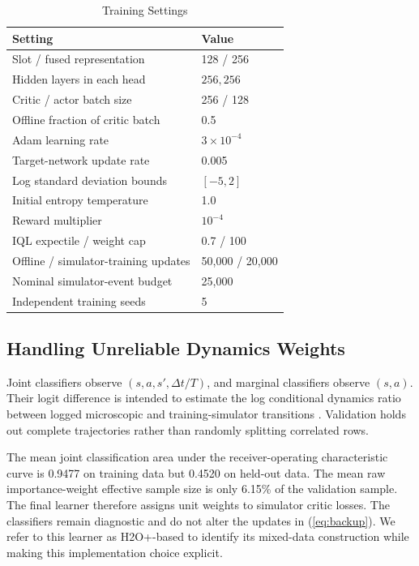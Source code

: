 \documentclass[letterpaper,journal]{IEEEtran}
\begin{document}
\begin{table}[!t]
\caption{Training Settings}
\label{tab:training}
\centering
\footnotesize
\begin{tabular}{@{}p{}p{}@{}}
\toprule
Setting & Value\\
\midrule
Slot / fused representation & 128 / 256\\
Hidden layers in each head & \(256,256\)\\
Critic / actor batch size & 256 / 128\\
Offline fraction of critic batch & 0.5\\
Adam learning rate & \(3\times10^{-4}\)\\
Target-network update rate & 0.005\\
Log standard deviation bounds & \([-5,2]\)\\
Initial entropy temperature & 1.0\\
Reward multiplier & \(10^{-4}\)\\
IQL expectile / weight cap & 0.7 / 100\\
Offline / simulator-training updates & 50,000 / 20,000\\
Nominal simulator-event budget & 25,000\\
Independent training seeds & 5\\
\bottomrule
\end{tabular}
\end{table}

\subsection{Handling Unreliable Dynamics Weights}
Joint classifiers observe \((s,a,s',\Delta t/T)\), and marginal classifiers observe \((s,a)\). Their logit difference is intended to estimate the log conditional dynamics ratio between logged microscopic and training-simulator transitions \cite{eysenbach2021off,niu2025h2oplus}. Validation holds out complete trajectories rather than randomly splitting correlated rows.

The mean joint classification area under the receiver-operating characteristic curve is 0.9477 on training data but 0.4520 on held-out data. The mean raw importance-weight effective sample size is only 6.15\% of the validation sample. The final learner therefore assigns unit weights to simulator critic losses. The classifiers remain diagnostic and do not alter the updates in (\ref{eq:backup}). We refer to this learner as H2O+-based to identify its mixed-data construction while making this implementation choice explicit.
\end{document}
